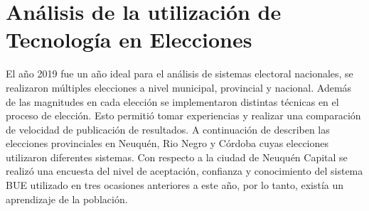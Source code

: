 \section{Análisis de la utilización de Tecnología en Elecciones}
El año 2019 fue un año ideal para el análisis de sistemas electoral nacionales, se realizaron múltiples elecciones a nivel municipal, provincial y nacional. Además de las magnitudes en cada elección se implementaron distintas técnicas en el proceso de elección. Esto permitió tomar experiencias y realizar una comparación de velocidad de publicación de resultados. A continuación de describen las elecciones provinciales en Neuquén, Rio Negro y Córdoba cuyas elecciones utilizaron diferentes sistemas. Con respecto a la ciudad de Neuquén Capital se realizó una encuesta del nivel de aceptación, confianza y conocimiento del sistema BUE utilizado en tres ocasiones anteriores a este año, por lo tanto, existía un aprendizaje de la población.


